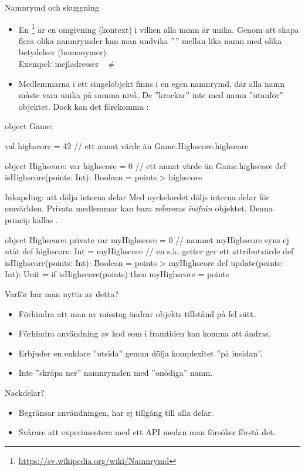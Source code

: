 \begin{Slide}{Namnrymd och skuggning}
\begin{itemize}\SlideFontSmall
  \item En \footnote{\url{https://sv.wikipedia.org/wiki/Namnrymd}}   är en omgivning (kontext) i vilken alla namn är unika. Genom att skapa flera olika namnrymder
  kan man undvika '''' mellan lika namn med olika betydelser (homonymer). \\
  Exempel: mejladresser   ~$\neq$~  
\pause
  \item Medlemmarna i ett singelobjekt finns i en egen namnrymd,
  där alla namn måste vara unika på samma nivå. De ''krockar'' inte med namn ''utanför'' objektet. Dock kan det förekomma  :
\end{itemize}
\begin{Code}
object Game:

  val highscore = 42   // ett annat värde än Game.Highscore.highscore

  object Highscore:
    var highscore = 0  // ett annat värde än Game.highscore
    def isHighscore(points: Int): Boolean = points > highscore
\end{Code}

\end{Slide}



\begin{Slide}{Inkapsling: att dölja interna delar}\SlideFontSmall
Med nyckelordet  döljs interna delar för omvärlden.
Privata medlemmar kan bara refereras \emph{inifrån} objektet.
Denna princip kallas  .
\begin{CodeSmall}
object Highscore:
  private var myHighscore = 0        // namnet myHighscore syns ej utåt
  def highscore: Int = myHighscore   // en s.k. getter ger ett attributvärde
  def isHighscore(points: Int): Boolean = points > myHighscore
  def update(points: Int): Unit = if isHighscore(points) then myHighscore = points
\end{CodeSmall}
Varför har man nytta av detta?
\pause

\begin{itemize}
  \item Förhindra att man av misstag ändrar objekts tillstånd på fel sätt.
  \item Förhindra användning av kod som i framtiden kan komma att ändras.
  \item Erbjuder en enklare ''utsida'' genom dölja komplexitet ''på insidan''.
  \item Inte ''skräpa ner'' namnrymden med ''onödiga'' namn.
\end{itemize}
Nackdelar?
\pause
\begin{itemize}
  \item Begränsar användningen, har ej tillgång till alla delar.
  \item Svårare att experimentera med ett API medan man försöker förstå det.
\end{itemize}
\end{Slide}



